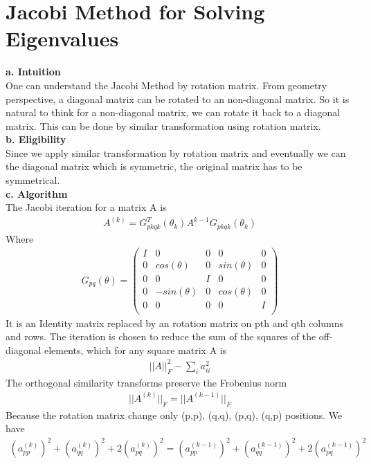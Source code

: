 \documentclass[a4paper]{article}
\begin{document}
\section{Jacobi Method for Solving Eigenvalues}
{\bf a. Intuition}\\
One can understand the Jacobi Method by rotation matrix. From geometry perspective, a diagonal matrix can be rotated to an non-diagonal matrix. So it is natural to think for a non-diagonal matrix, we can rotate it back to a diagonal matrix. This can be done by similar transformation using rotation matrix.\\
{\bf b. Eligibility}\\
Since we apply similar transformation by rotation matrix and eventually we can the diagonal matrix which is symmetric, the original matrix has to be symmetrical.\\
{\bf c. Algorithm}\\
The Jacobi iteration for a matrix A is
\begin{align*}
	A^{(k)} = G^T_{pkqk}(\theta_k) A^{k-1} G_{pkqk} (\theta_k)
\end{align*}
Where
\begin{align*}
	G_{pq}(\theta)
	= 
	\left( \begin{array}{ccccc}
I      & 	0 	& 	0 	 & 	 0 		& 	0 	\\
0	   & 	cos(\theta) 	& 	0 	 &	 sin(\theta) 		& 	0	\\
0 	   &    0   &   I  	 &   0		&	0	\\
0 	   &    -sin(\theta)   &   0    &   cos(\theta)		& 	0	\\
0      &    0   &   0    & 	 0   	& 	I	\\\end{array} \right)
\end{align*}
It is an Identity matrix replaced by an rotation matrix on pth and qth columns and rows. The iteration is chosen to reduce the sum of the squares of the off-diagonal elements, which for any square matrix A is
\begin{align*}
	||A||_F^2 - \sum_i a_{ii}^2
\end{align*}
The orthogonal similarity transforms preserve the Frobenius norm
\begin{align*}
	|| A^{(k)}||_F = ||A^{(k-1)}||_F
\end{align*}
Because the rotation matrix change only (p,p), (q,q), (p,q), (q,p) positions. We have
\begin{align*}
	(a_{pp}^{(k)})^2 + (a_{qq}^{(k)})^2+ 2 (a_{pq}^{(k)})^2 = (a_{pp}^{(k-1)})^2 + (a_{qq}^{(k-1)})^2 + 2 (a_{pq}^{(k-1)})^2   
\end{align*}
\end{document}
